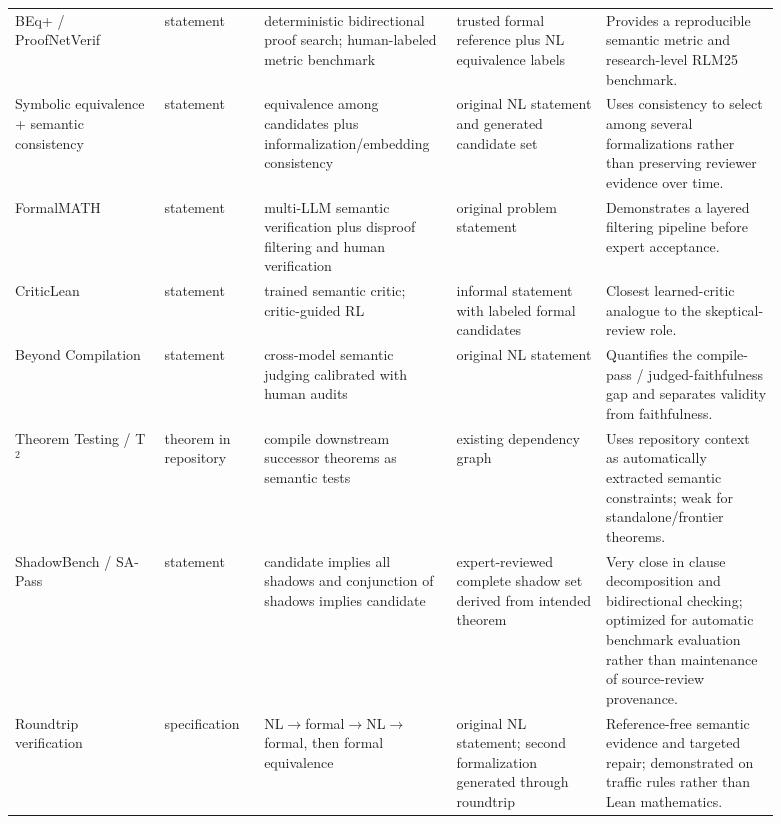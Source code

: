 \documentclass[11pt]{article}
\begin{document}
\begin{landscape}
\begin{longtable}{@{}p{0.18\linewidth}p{0.12\linewidth}p{0.20\linewidth}p{0.18\linewidth}p{0.21\linewidth}@{}}
BEq+ / ProofNetVerif \citep{poiroux2025reliable} & statement & deterministic bidirectional proof search; human-labeled metric benchmark & trusted formal reference plus NL equivalence labels & Provides a reproducible semantic metric and research-level RLM25 benchmark. \\

Symbolic equivalence + semantic consistency \citep{li2024symbolic} & statement & equivalence among candidates plus informalization/embedding consistency & original NL statement and generated candidate set & Uses consistency to select among several formalizations rather than preserving reviewer evidence over time. \\

FormalMATH \citep{yu2025formalmath} & statement & multi-LLM semantic verification plus disproof filtering and human verification & original problem statement & Demonstrates a layered filtering pipeline before expert acceptance. \\

CriticLean \citep{peng2025criticlean} & statement & trained semantic critic; critic-guided RL & informal statement with labeled formal candidates & Closest learned-critic analogue to the skeptical-review role. \\

Beyond Compilation \citep{zhang2026beyondcompilation} & statement & cross-model semantic judging calibrated with human audits & original NL statement & Quantifies the compile-pass / judged-faithfulness gap and separates validity from faithfulness. \\

Theorem Testing / T$^2$ \citep{kim2026theoremtesting} & theorem in repository & compile downstream successor theorems as semantic tests & existing dependency graph & Uses repository context as automatically extracted semantic constraints; weak for standalone/frontier theorems. \\

ShadowBench / SA-Pass \citep{han2026shadowbench} & statement & candidate implies all shadows and conjunction of shadows implies candidate & expert-reviewed complete shadow set derived from intended theorem & Very close in clause decomposition and bidirectional checking; optimized for automatic benchmark evaluation rather than maintenance of source-review provenance. \\

Roundtrip verification \citep{amrollahi2026roundtrip} & specification & NL$\rightarrow$formal$\rightarrow$NL$\rightarrow$formal, then formal equivalence & original NL statement; second formalization generated through roundtrip & Reference-free semantic evidence and targeted repair; demonstrated on traffic rules rather than Lean mathematics. \\


\end{longtable}
\end{landscape}
\end{document}
